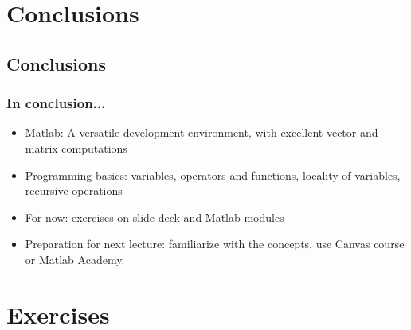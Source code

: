 \section{Conclusions}
\subsection*{Conclusions}
\begin{frame}[fragile]
  \frametitle{In conclusion...}
  \begin{itemize}
     \item Matlab: A versatile development environment, with excellent vector and matrix computations
     \item Programming basics: variables, operators and functions, locality of variables, recursive operations
  \end{itemize}
  \pause
    \begin{itemize}
     \item For now: exercises on slide deck and Matlab modules
     \item Preparation for next lecture: familiarize with the concepts, use Canvas course or Matlab Academy.
  \end{itemize}
\end{frame}

\section{Exercises}
